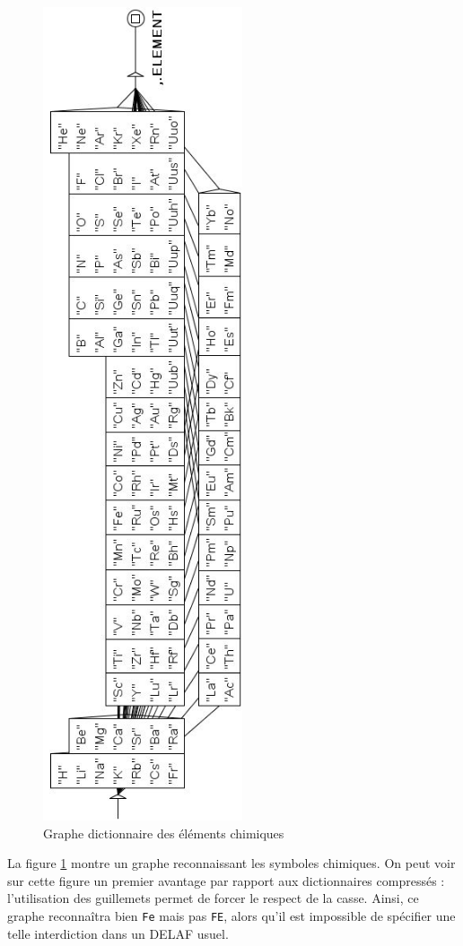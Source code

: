 \begin{figure}[!p]
\begin{center}
\includegraphics[height=24cm]{resources/img/fig3-12.png}
\caption{Graphe dictionnaire des éléments chimiques\label{elements}}
\end{center}
\end{figure}

\bigskip
\noindent La figure \ref{elements} montre un graphe reconnaissant les symboles chimiques. On peut
voir sur cette figure un premier avantage par rapport aux dictionnaires compressés : l’utilisation
des guillemets permet de forcer le respect de la casse. Ainsi, ce graphe reconnaîtra bien \verb+Fe+
mais pas \verb+FE+, alors qu’il est impossible de spécifier une telle interdiction dans un DELAF
usuel.

